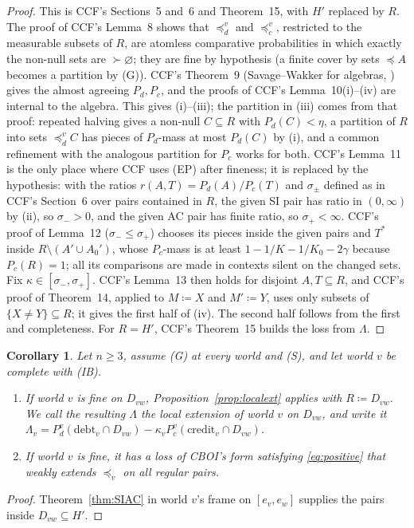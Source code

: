 \documentclass[11pt]{article}
\newtheorem{corollary}[theorem]{Corollary}
\theoremstyle{definition}\newtheorem{definition}[theorem]{Definition}
\theoremstyle{remark}\newtheorem{remark}[theorem]{Remark}
\newcommand{\debt}{\mathrm{debt}}
\newcommand{\cred}{\mathrm{credit}}
\begin{document}
\begin{proof}
This is CCF's Sections~5 and~6 and Theorem~15, with $H'$ replaced by $R$. The proof of CCF's
Lemma~8 shows that $\preceq^v_d$ and $\preceq^v_c$, restricted to the
measurable subsets of $R$, are atomless comparative probabilities in which
exactly the non-null sets are $\succ\varnothing$; they are fine by
hypothesis (a finite cover by sets $\preceq A$ becomes a partition by (G)).
CCF's Theorem~9 (Savage--Wakker for algebras,
\cite{Savage,Wakker}) gives the almost agreeing
$P_d,P_c$, and the proofs of CCF's Lemma~10(i)--(iv) are internal to the
algebra. This gives (i)--(iii); the partition in (iii) comes from that proof:
repeated halving gives a non-null $C\subseteq R$ with $P_d(C)<\eta$, a
partition of $R$ into sets $\preceq^v_dC$ has pieces of $P_d$-mass at most
$P_d(C)$ by (i), and a common refinement with the analogous partition for
$P_c$ works for both. CCF's Lemma~11 is the only place where CCF uses (EP)
after fineness; it is replaced by the hypothesis: with the ratios
$r(A,T)=P_d(A)/P_c(T)$ and $\sigma_\pm$ defined as in CCF's Section~6 over
pairs contained in $R$, the given SI pair has ratio in $(0,\infty)$ by (ii),
so $\sigma_->0$, and the given AC pair has finite ratio, so
$\sigma_+<\infty$. CCF's proof of Lemma~12 ($\sigma_-\le\sigma_+$) chooses
its pieces inside the given pairs and $T^*$ inside $R\setminus(A'\cup A_0')$,
whose $P_c$-mass is at least $1-1/K-1/K_0-2\gamma$ because $P_c(R)=1$; all
its comparisons are made in contexts silent on the changed sets. Fix
$\kappa\in[\sigma_-,\sigma_+]$. CCF's Lemma~13 then holds for disjoint
$A,T\subseteq R$, and CCF's proof of Theorem~14, applied to $M\coloneqq X$
and $M'\coloneqq Y$, uses only subsets of $\{X\ne Y\}\subseteq R$; it gives
the first half of (iv). The second half follows from the first and
completeness. For $R=H'$, CCF's Theorem~15 builds the loss from $\Lambda$.
\end{proof}

\begin{corollary}\label{cor:ext}
Let $n\ge3$, assume (G) at every world and (S), and let world $v$ be complete
with (IB).
\begin{enumerate}[label=(\alph*)]
\item If world $v$ is fine on $D_{vw}$, Proposition~\ref{prop:localext}
applies with $R\coloneqq D_{vw}$. We call the resulting $\Lambda$ the
\emph{local extension} of world $v$ on $D_{vw}$, and write it
$\Lambda_v=P^v_d(\debt_v\cap D_{vw})-\kappa_vP^v_c(\cred_v\cap D_{vw})$.
\item If world $v$ is fine, it has a loss of CBOI's form satisfying
\eqref{eq:positive} that weakly extends $\preceq_v$ on all regular pairs.
\end{enumerate}
\end{corollary}
\begin{proof}
Theorem~\ref{thm:SIAC} in world $v$'s frame on $[e_v,e_w]$ supplies the
pairs inside $D_{vw}\subseteq H'$.
\end{proof}
\end{document}
